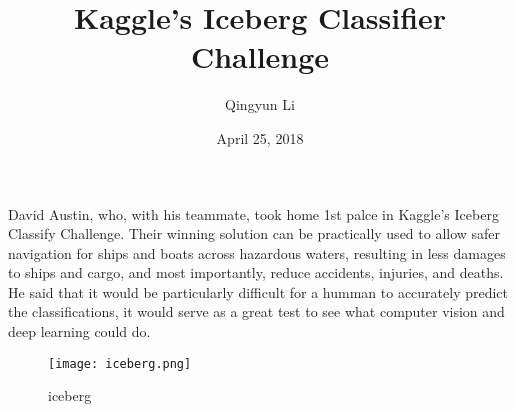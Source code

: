 \documentclass{article}
\author{Qingyun Li}
\date{April 25, 2018}
\title{Kaggle’s Iceberg Classifier Challenge}
\begin{document}
\maketitle
 \par David Austin, who, with his teammate, took home 1st palce in Kaggle's Iceberg Classify Challenge. Their winning solution can be practically used to allow safer navigation for ships and boats across hazardous waters, resulting in less damages to ships and cargo, and most importantly, reduce accidents, injuries, and deaths. He said that it would be particularly difficult for a humman to accurately predict the classifications, it would serve as a great test to see what computer vision and deep learning could do. 
\begin{figure}[htbp]
\begin{minipage}{1\linewidth}
\centering{}
\texttt{[image: iceberg.png]}\\
\caption{iceberg}\label{image} 
\end{minipage}
\end{figure}
\end{document}
